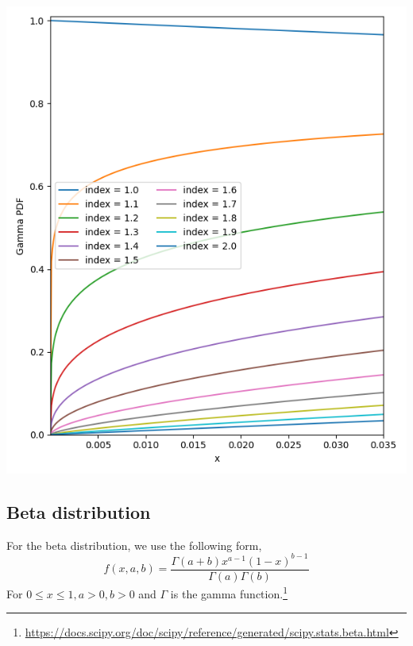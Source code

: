 \hfill
\begin{minipage}[r]{0.48\columnwidth}
	\centering
    \includegraphics[width=\linewidth]{analysis_data/004__images_for_latex/gamma}
	\label{fig:gamma_distribution}
\end{minipage}

\subsection{Beta distribution}
\label{subsec:beta-distribution}

For the beta distribution, we use the following form,
\begin{equation}
    f(x, a, b) = \frac{\Gamma(a+b)x^{a-1}(1-x)^{b-1}}{\Gamma(a)\Gamma(b)}
    \label{eq:beta_distribution}
\end{equation}
For $0 \leq x \leq 1, a > 0, b > 0$ and $\Gamma$ is the gamma function.\footnote{\url{https://docs.scipy.org/doc/scipy/reference/generated/scipy.stats.beta.html}}

